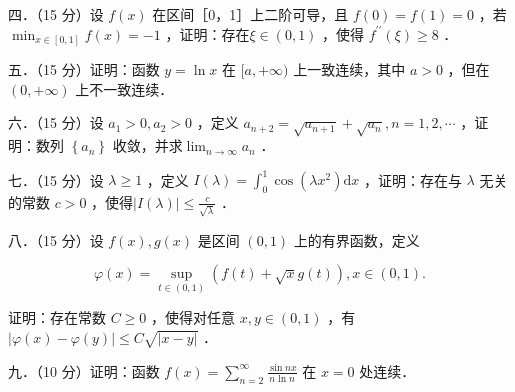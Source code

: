 \documentclass{article}
\begin{document}
四．（15 分）设 \(f(x)\) 在区间［0，1］上二阶可导，且 \(f(0)=f(1)=0\) ，若 \(\min _{x \in[0,1]} f(x)=-1\) ，证明：存在\(\xi \in(0,1)\) ，使得 \(f^{\prime \prime}(\xi) \geq 8\) ．

五．（15 分）证明：函数 \(y=\ln x\) 在 \([a,+\infty)\) 上一致连续，其中 \(a>0\) ，但在 \((0,+\infty)\) 上不一致连续．

六．（15 分）设 \(a_{1}>0, a_{2}>0\) ，定义 \(a_{n+2}=\sqrt{a_{n+1}}+\sqrt{a_{n}}, n=1,2, \cdots\) ，证明：数列 \(\left\{a_{n}\right\}\) 收敛，并求\(\lim _{n \rightarrow \infty} a_{n}\) ．

七．（15 分）设 \(\lambda \geq 1\) ，定义 \(I(\lambda)=\int_{0}^{1} \cos \left(\lambda x^{2}\right) \mathrm{d} x\) ，证明：存在与 \(\lambda\) 无关的常数 \(c>0\) ，使得\(|I(\lambda)| \leq \frac{c}{\sqrt{\lambda}}\) ．

八．（15 分）设 \(f(x), g(x)\) 是区间 \((0,1)\) 上的有界函数，定义

\[
\varphi(x)=\sup _{t \in(0,1)}(f(t)+\sqrt{x} g(t)), x \in(0,1) .
\]

证明：存在常数 \(C \geq 0\) ，使得对任意 \(x, y \in(0,1)\) ，有 \(|\varphi(x)-\varphi(y)| \leq C \sqrt{|x-y|}\) ．

九．（10 分）证明：函数 \(f(x)=\sum_{n=2}^{\infty} \frac{\sin n x}{n \ln n}\) 在 \(x=0\) 处连续．
\end{document}
